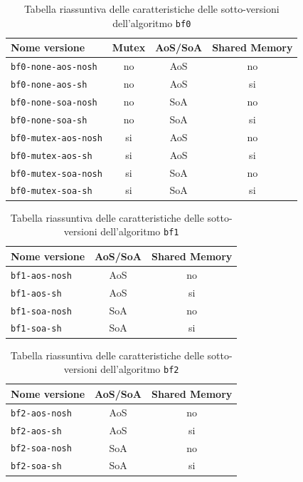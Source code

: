 \documentclass[12pt,a4paper]{book}
\begin{document}
	\begin{table}[!ht]
		\centering
		\begin{tabular}{|l|c|c|c|}
			\hline
			\textbf{Nome versione} & \textbf{Mutex} & \textbf{AoS/SoA} & \textbf{Shared Memory} \\ \hline
			\texttt{bf0-none-aos-nosh}  & no & AoS & no \\ \hline
			\texttt{bf0-none-aos-sh}    & no & AoS & si \\ \hline
			\texttt{bf0-none-soa-nosh}  & no & SoA & no \\ \hline
			\texttt{bf0-none-soa-sh}    & no & SoA & si \\ \hline
			\texttt{bf0-mutex-aos-nosh} & si & AoS & no \\ \hline
			\texttt{bf0-mutex-aos-sh}   & si & AoS & si \\ \hline
			\texttt{bf0-mutex-soa-nosh} & si & SoA & no \\ \hline
			\texttt{bf0-mutex-soa-sh}   & si & SoA & si \\ \hline
		\end{tabular}
		\label{tab:riassunto_bf0}
		\caption{Tabella riassuntiva delle caratteristiche delle sotto-versioni dell'algoritmo \texttt{bf0}}
	\end{table}

	\begin{table}[!ht]
		\centering
		\begin{tabular}{|l|c|c|}
			\hline
			\textbf{Nome versione} & \textbf{AoS/SoA} & \textbf{Shared Memory} \\ \hline
			\texttt{bf1-aos-nosh}  & AoS & no \\ \hline
			\texttt{bf1-aos-sh}    & AoS & si \\ \hline
			\texttt{bf1-soa-nosh}  & SoA & no \\ \hline
			\texttt{bf1-soa-sh}    & SoA & si \\ \hline
		\end{tabular}
		\label{tab:riassunto_bf1}
		\caption{Tabella riassuntiva delle caratteristiche delle sotto-versioni dell'algoritmo \texttt{bf1}}
	\end{table}

	\begin{table}[!ht]
		\centering
		\begin{tabular}{|l|c|c|}
			\hline
			\textbf{Nome versione} & \textbf{AoS/SoA} & \textbf{Shared Memory} \\ \hline
			\texttt{bf2-aos-nosh}  & AoS & no \\ \hline
			\texttt{bf2-aos-sh}    & AoS & si \\ \hline
			\texttt{bf2-soa-nosh}  & SoA & no \\ \hline
			\texttt{bf2-soa-sh}    & SoA & si \\ \hline
		\end{tabular}
		\label{tab:riassunto_bf2}
		\caption{Tabella riassuntiva delle caratteristiche delle sotto-versioni dell'algoritmo \texttt{bf2}}
	\end{table}
	
\end{document}
